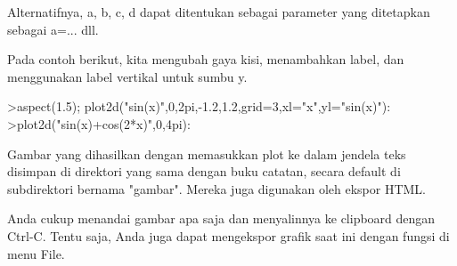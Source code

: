 \documentclass[a4paper,10pt]{article}
\begin{document}
\begin{eulernotebook}
\begin{eulercomment}
\begin{eulercomment}
\begin{eulercomment}
\begin{eulercomment}
\begin{eulercomment}
\begin{eulercomment}
\begin{eulercomment}
\begin{eulercomment}
\begin{eulercomment}
\begin{eulercomment}
\begin{eulercomment}
Alternatifnya, a, b, c, d dapat ditentukan sebagai parameter yang
ditetapkan sebagai a=... dll.

Pada contoh berikut, kita mengubah gaya kisi, menambahkan label, dan
menggunakan label vertikal untuk sumbu y.
\end{eulercomment}
\begin{eulerprompt}
>aspect(1.5); plot2d("sin(x)",0,2pi,-1.2,1.2,grid=3,xl="x",yl="sin(x)"):
>plot2d("sin(x)+cos(2*x)",0,4pi):
\end{eulerprompt}
\begin{eulercomment}
Gambar yang dihasilkan dengan memasukkan plot ke dalam jendela teks
disimpan di direktori yang sama dengan buku catatan, secara default di
subdirektori bernama "gambar". Mereka juga digunakan oleh ekspor HTML.

Anda cukup menandai gambar apa saja dan menyalinnya ke clipboard
dengan Ctrl-C. Tentu saja, Anda juga dapat mengekspor grafik saat ini
dengan fungsi di menu File.


\end{eulercomment}
\end{eulercomment}
\end{eulercomment}
\end{eulercomment}
\end{eulercomment}
\end{eulercomment}
\end{eulercomment}
\end{eulercomment}
\end{eulercomment}
\end{eulercomment}
\end{eulercomment}
\end{eulernotebook}
\end{document}
